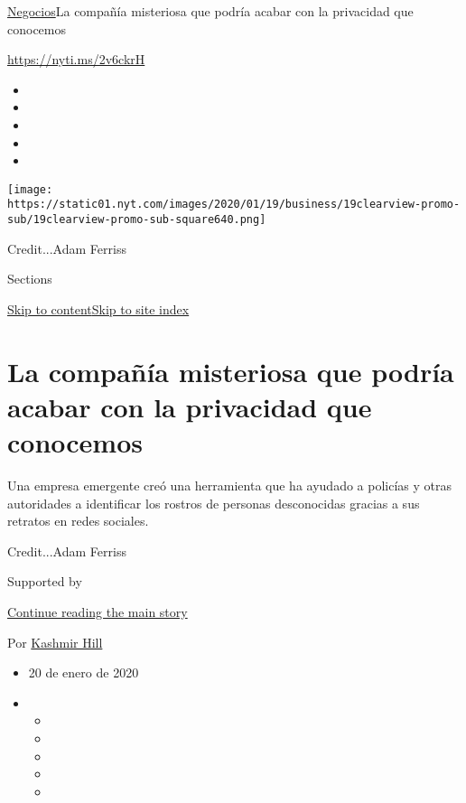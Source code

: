 \href{/es/section/negocios}{Negocios}\textbar{}La compañía misteriosa
que podría acabar con la privacidad que conocemos

\url{https://nyti.ms/2v6ckrH}

\begin{itemize}
\item
\item
\item
\item
\item
\end{itemize}

\texttt{[image: https://static01.nyt.com/images/2020/01/19/business/19clearview-promo-sub/19clearview-promo-sub-square640.png]}

Credit...Adam Ferriss

Sections

\protect\hyperlink{site-content}{Skip to
content}\protect\hyperlink{site-index}{Skip to site index}

\hypertarget{la-compauxf1uxeda-misteriosa-que-podruxeda-acabar-con-la-privacidad-que-conocemos}{%
\section{La compañía misteriosa que podría acabar con la privacidad que
conocemos}\label{la-compauxf1uxeda-misteriosa-que-podruxeda-acabar-con-la-privacidad-que-conocemos}}

Una empresa emergente creó una herramienta que ha ayudado a policías y
otras autoridades a identificar los rostros de personas desconocidas
gracias a sus retratos en redes sociales.

Credit...Adam Ferriss

Supported by

\protect\hyperlink{after-sponsor}{Continue reading the main story}

Por \href{https://www.nytimes.com/by/kashmir-hill}{Kashmir Hill}

\begin{itemize}
\item
  20 de enero de 2020
\item
  \begin{itemize}
  \item
  \item
  \item
  \item
  \item
  \end{itemize}
\end{itemize}


